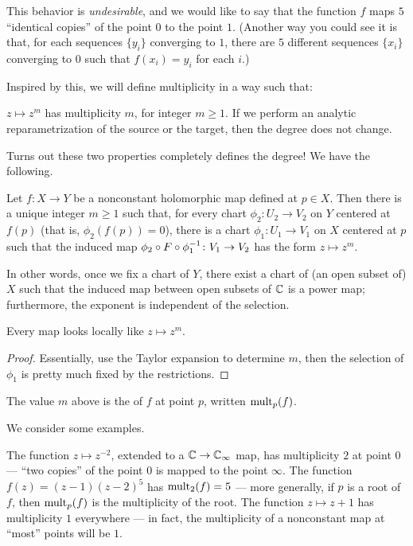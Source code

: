 This behavior is \emph{undesirable}, and we would like to say that the function $f$ maps $5$
``identical copies'' of the point $0$ to the point $1$.
(Another way you could see it is that, for each sequences $\{ y_i \}$ converging to $1$, there are
$5$ different sequences $\{ x_i \}$ converging to $0$ such that $f(x_i) = y_i$ for each $i$.)

Inspired by this, we will define multiplicity in a way such that:
\begin{itemize}
	\ii $z \mapsto z^m$ has multiplicity $m$, for integer $m \geq 1$.
	\ii If we perform an analytic reparametrization of the source or the target, then the degree
	does not change.
\end{itemize}
Turns out these two properties completely defines the degree! We have the following.
\begin{proposition}
	Let $f \colon X \to Y$ be a nonconstant holomorphic map defined at $p \in X$.
	Then there is a unique integer $m \geq 1$ such that, for every chart $\phi_2 \colon U_2 \to V_2$
	on $Y$ centered at $f(p)$ (that is, $\phi_2(f(p)) = 0$),
	there is a chart $\phi_1 \colon U_1 \to V_1$ on $X$ centered at $p$
	such that the induced map $\phi_2 \circ F \circ \phi_1^{-1} \colon V_1 \to V_2$
	has the form $z \mapsto z^m$.
\end{proposition}
In other words, once we fix a chart of $Y$, there exist a chart of (an open subset of) $X$
such that the induced map between open subsets of $\mathbb C$ is a power map;
furthermore, the exponent is independent of the selection.
\begin{moral}
	Every map looks locally like $z \mapsto z^m$.
\end{moral}
\begin{proof}
	Essentially, use the Taylor expansion to determine $m$, then the selection of $\phi_1$ is pretty
	much fixed by the restrictions.
\end{proof}

\begin{definition}
	The value $m$ above is the  of $f$ at point $p$, written $\operatorname{mult}_p(f)$.
\end{definition}

\begin{example}
	We consider some examples.
	\begin{itemize}
		\ii The function $z \mapsto z^{-2}$, extended to a $\mathbb C \to \mathbb C_\infty$ map,
		has multiplicity $2$ at point $0$ --- ``two copies'' of the point $0$ is mapped to the point
		$\infty$.
		\ii The function $f(z) = (z-1) (z-2)^5$ has $\operatorname{mult}_2(f) = 5$ --- more generally,
		if $p$ is a root of $f$, then $\operatorname{mult}_p(f)$ is the multiplicity of the root.
		\ii The function $z \mapsto z + 1$ has multiplicity $1$ everywhere --- in fact,
		the multiplicity of a nonconstant map at ``most'' points will be $1$.
	\end{itemize}
\end{example}

